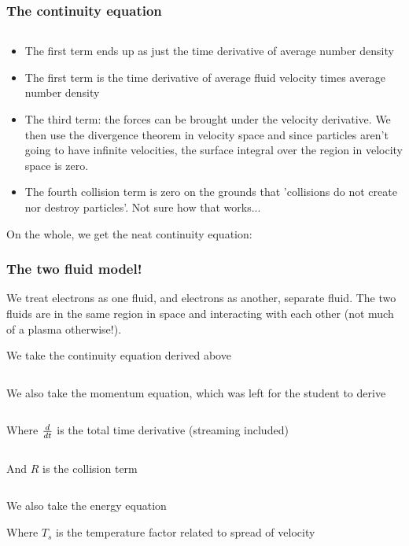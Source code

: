 \documentclass[PlasmaNotes.tex]{subfiles}
\begin{document}
\subsubsection{The continuity equation}

\[ \]

\begin{itemize}
\item The first term ends up as just the time derivative of average number density
\[ \]
\item The first term is the time derivative of average fluid velocity times average number density
\[ \]

\item The third term: the forces can be brought under the velocity derivative. We then use the divergence theorem in velocity space and since particles aren't going to have infinite velocities, the surface integral over the region in velocity space is zero.
\[ \]

\item The fourth collision term is zero on the grounds that 'collisions do not create nor destroy particles'. Not sure how that works...
\end{itemize}

On the whole, we get the neat continuity equation:
\[ \]

\subsubsection{The two fluid model!}

We treat electrons as one fluid, and electrons as another, separate fluid. The two fluids are in the same region in space and interacting with each other (not much of a plasma otherwise!).

We take the continuity equation derived above

\[ \]

We also take the momentum equation, which was left for the student to derive

\[ \]

Where $\frac{d }{d t}$ is the total time derivative (streaming included)

\[ \]

And $R$ is the collision term

\[ \]

We also take the energy equation

Where $T_s$ is the temperature factor related to spread of velocity
\end{document}
